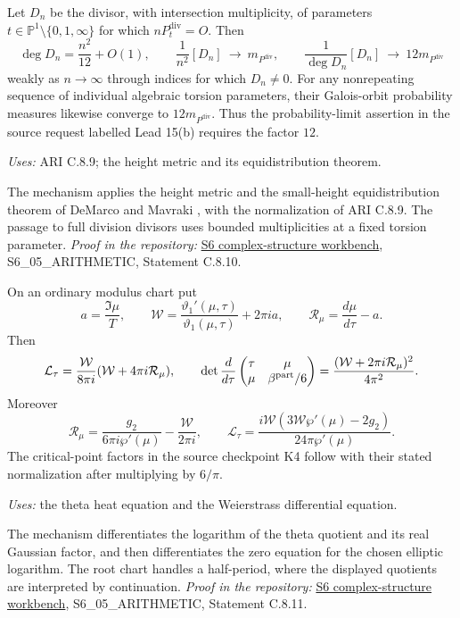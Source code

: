\begin{announcement}\label{ari:C.8.10}
Let $D_n$ be the divisor, with intersection multiplicity, of
parameters $t\in\mathbb{P}^1\setminus\{0,1,\infty\}$ for which
$nP^{\mathrm{div}}_t=O$. Then
\[
 \deg D_n=\frac{n^2}{12}+O(1),\qquad
 \frac1{n^2}[D_n]\ \longrightarrow\ m_{P^{\mathrm{div}}},\qquad
 \frac1{\deg D_n}[D_n]\ \longrightarrow\ 12m_{P^{\mathrm{div}}}
\]
weakly as $n\to\infty$ through indices for which $D_n\ne0$.
For any nonrepeating sequence of individual algebraic torsion
parameters, their Galois-orbit probability measures likewise
converge to $12m_{P^{\mathrm{div}}}$. Thus the probability-limit assertion
in the source request labelled Lead 15(b) requires the factor $12$.
\end{announcement}
\noindent\textit{Uses:} ARI C.8.9; the height metric and its equidistribution theorem.\par
The mechanism applies the height metric and the small-height equidistribution theorem of DeMarco and Mavraki \cite[Theorem~1.1 and Corollary~1.2]{DM20}, with the normalization of ARI C.8.9. The passage to full division divisors uses bounded multiplicities at a fixed torsion parameter.
\noindent\textit{Proof in the repository:} \href{https://github.com/KokunoYumeto/s6-complex-structure-workbench}{S6 complex-structure workbench}, S6\_05\_ARITHMETIC, Statement C.8.10.

\begin{announcement}\label{ari:C.8.11}
On an ordinary modulus chart put
\[
 a=\frac{\Im\mu}{T},\qquad
 \mathcal W=\frac{\vartheta_1'(\mu,\tau)}{\vartheta_1(\mu,\tau)}
                         +2\pi ia,\qquad
 \mathcal R_\mu=\frac{d\mu}{d\tau}-a.
\]
Then
\[
 \mathcal L_\tau=\frac{\mathcal W}{8\pi i}(\mathcal W+4\pi i\mathcal R_\mu),\qquad
 \det\frac{d}{d\tau}
 \begin{pmatrix}\tau&\mu\\\mu&\beta^{\rm part}/6\end{pmatrix}
       =\frac{(\mathcal W+2\pi i\mathcal R_\mu)^2}{4\pi^2}.
\]
Moreover
\[
 \mathcal R_\mu=\frac{g_2}{6\pi i\wp'(\mu)}-\frac{\mathcal W}{2\pi i},
 \qquad
 \mathcal L_\tau=\frac{i\mathcal W(3\mathcal W\wp'(\mu)-2g_2)}
                         {24\pi\wp'(\mu)}.
\]
The critical-point factors in the source checkpoint K4 follow with their stated
normalization after multiplying by $6/\pi$.
\end{announcement}
\noindent\textit{Uses:} the theta heat equation and the Weierstrass differential equation.\par
The mechanism differentiates the logarithm of the theta quotient and its real Gaussian factor, and then differentiates the zero equation for the chosen elliptic logarithm. The root chart handles a half-period, where the displayed quotients are interpreted by continuation.
\noindent\textit{Proof in the repository:} \href{https://github.com/KokunoYumeto/s6-complex-structure-workbench}{S6 complex-structure workbench}, S6\_05\_ARITHMETIC, Statement C.8.11.

